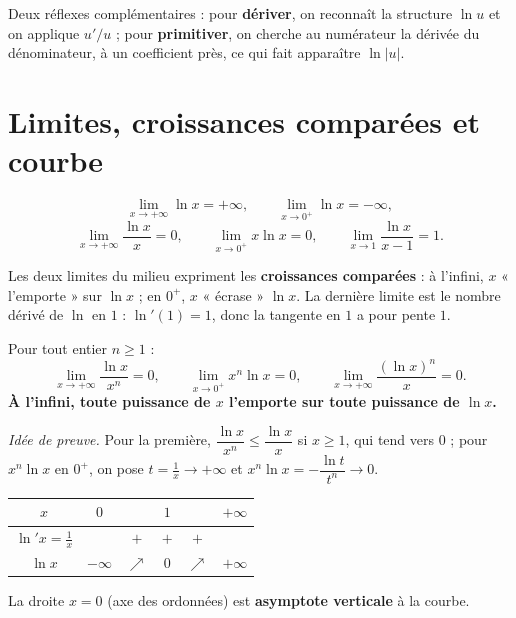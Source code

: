 \begin{aretenir}
Deux réflexes complémentaires : pour \textbf{dériver}, on reconnaît la structure $\ln u$
et on applique $u'/u$ ; pour \textbf{primitiver}, on cherche au numérateur la dérivée du
dénominateur, à un coefficient près, ce qui fait apparaître $\ln|u|$.
\end{aretenir}

\section{Limites, croissances comparées et courbe}

\begin{theoreme}
\[
\lim_{x\to+\infty}\ln x=+\infty,\qquad
\lim_{x\to0^{+}}\ln x=-\infty,
\]
\[
\lim_{x\to+\infty}\frac{\ln x}{x}=0,\qquad
\lim_{x\to0^{+}}x\ln x=0,\qquad
\lim_{x\to1}\frac{\ln x}{x-1}=1.
\]
\end{theoreme}

\begin{remarque}
Les deux limites du milieu expriment les \textbf{croissances comparées} : à l'infini, $x$
« l'emporte » sur $\ln x$ ; en $0^+$, $x$ « écrase » $\ln x$. La dernière limite est le
nombre dérivé de $\ln$ en $1$ : $\ln'(1)=1$, donc la tangente en $1$ a pour pente $1$.
\end{remarque}

\begin{propriete}
Pour tout entier $n\ge1$ :
\[
\lim_{x\to+\infty}\frac{\ln x}{x^{n}}=0,\qquad
\lim_{x\to0^{+}}x^{n}\ln x=0,\qquad
\lim_{x\to+\infty}\frac{(\ln x)^{n}}{x}=0.
\]
\textbf{À l'infini, toute puissance de $x$ l'emporte sur toute puissance de $\ln x$.}
\end{propriete}

\noindent\textit{Idée de preuve.} Pour la première, $\dfrac{\ln x}{x^{n}}\le\dfrac{\ln x}{x}$
si $x\ge1$, qui tend vers $0$ ; pour $x^{n}\ln x$ en $0^+$, on pose $t=\frac1x\to+\infty$
et $x^{n}\ln x=-\dfrac{\ln t}{t^{n}}\to0$.

\begin{propriete}
\begin{center}\small
\begin{tabular}{c|ccccc}
$x$ & $0$ & & $1$ & & $+\infty$\\
\hline
$\ln' x=\frac1x$ & & $+$ & $+$ & $+$ & \\
\hline
$\ln x$ & $-\infty$ & $\nearrow$ & $0$ & $\nearrow$ & $+\infty$\\
\end{tabular}
\end{center}
La droite $x=0$ (axe des ordonnées) est \textbf{asymptote verticale} à la courbe.
\end{propriete}

